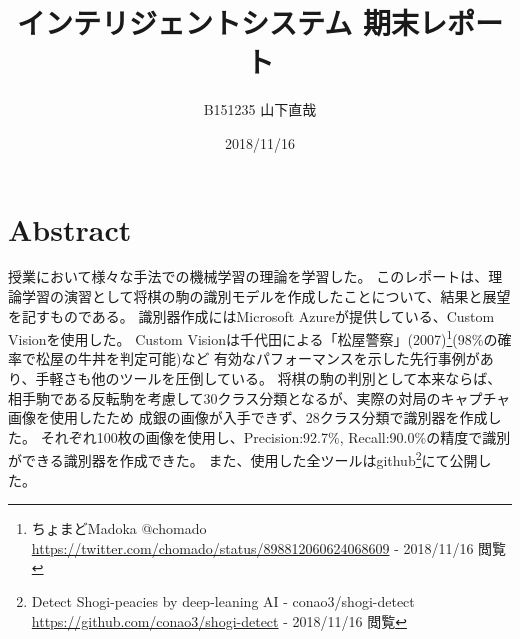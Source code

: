 \documentclass[uplatex, dvipdfmx]{jsarticle}
\author{B151235 山下直哉}
\date{2018/11/16}
\title{インテリジェントシステム 期末レポート}
\begin{document}
\maketitle

\section{Abstract}
\label{sec:org2bfde57}
授業において様々な手法での機械学習の理論を学習した。
このレポートは、理論学習の演習として将棋の駒の識別モデルを作成したことについて、結果と展望を記すものである。
識別器作成にはMicrosoft Azureが提供している、Custom Visionを使用した。
Custom Visionは千代田による「松屋警察」(2007)\footnote{ちょまどMadoka @chomado
\url{https://twitter.com/chomado/status/898812060624068609} - 2018/11/16 閲覧}(98\%の確率で松屋の牛丼を判定可能)など
有効なパフォーマンスを示した先行事例があり、手軽さも他のツールを圧倒している。
将棋の駒の判別として本来ならば、相手駒である反転駒を考慮して30クラス分類となるが、実際の対局のキャプチャ画像を使用したため
成銀の画像が入手できず、28クラス分類で識別器を作成した。
それぞれ100枚の画像を使用し、Precision:92.7\%, Recall:90.0\%の精度で識別ができる識別器を作成できた。
また、使用した全ツールはgithub\footnote{Detect Shogi-peacies by deep-leaning AI - conao3/shogi-detect
\url{https://github.com/conao3/shogi-detect} - 2018/11/16 閲覧}にて公開した。
\end{document}
